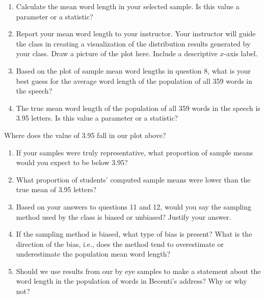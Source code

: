 \documentclass[
]{report}
\newcommand{\rgi}{\hspace{24pt}}  %
\begin{document}
\begin{enumerate}
\def\labelenumi{\arabic{enumi}.}
\setcounter{enumi}{6}
\item
  Calculate the mean word length in your selected sample. Is this value a parameter or a statistic?\\
  \vspace{0.3in}
\item
  Report your mean word length to your instructor. Your instructor will guide the class in creating a visualization of the distribution results generated by your class. Draw a picture of the plot here. Include a descriptive \(x\)-axis label.
  \vspace{1.5in}
\item
  Based on the plot of sample mean word lengths in question 8, what is your best guess for the average word length of the population of all 359 words in the speech?
  \vspace{0.3in}
\item
  The true mean word length of the population of all 359 words in the speech is 3.95 letters. Is this value a parameter or a statistic?\\
  \vspace{0.2in}
\end{enumerate}

\rgi Where does the value of 3.95 fall in our plot above?
\vspace{0.3in}

\begin{enumerate}
\def\labelenumi{\arabic{enumi}.}
\setcounter{enumi}{10}
\item
  If your samples were truly representative, what proportion of sample means would you expect to be below 3.95?
  \vspace{0.5in}
\item
  What proportion of students' computed sample means were lower than the true mean of 3.95 letters?
  \vspace{0.5in}
\item
  Based on your answers to questions 11 and 12, would you say the sampling method used by the class is biased or unbiased? Justify your answer.\\
  \vspace{0.5in}
\item
  If the sampling method is biased, what type of bias is present? What is the direction of the bias, i.e., does the method tend to overestimate or underestimate the population mean word length?
  \vspace{0.5in}
\item
  Should we use results from our by eye samples to make a statement about the word length in the population of words in Becenti's address? Why or why not?
  \vspace{1in}
\end{enumerate}
\end{document}
